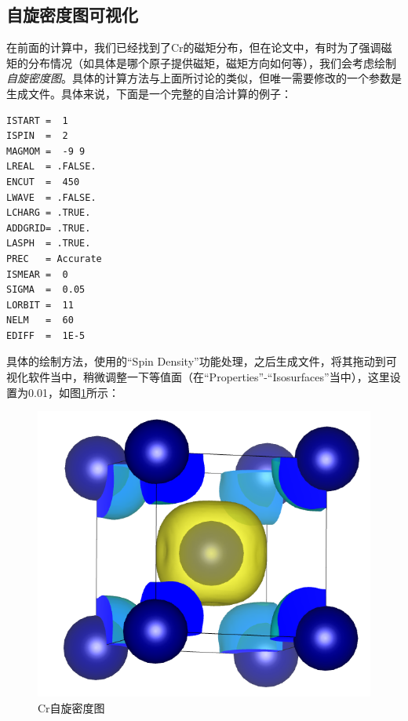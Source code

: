 \subsection{自旋密度图可视化}\label{subsec:磁矩计算-自旋密度图可视化}

在前面的计算中，我们已经找到了Cr的磁矩分布，但在论文中，有时为了强调磁矩的分布情况（如具体是哪个原子提供磁矩，磁矩方向如何等），我们会考虑绘制\emph{自旋密度图}。具体的计算方法与上面所讨论的类似，但唯一需要修改的一个参数是生成文件。具体来说，下面是一个完整的自洽计算的例子：

\begin{lstlisting}[caption=INCAR]
ISTART =  1
ISPIN  =  2
MAGMOM =  -9 9
LREAL  = .FALSE.
ENCUT  =  450
LWAVE  = .FALSE.
LCHARG = .TRUE.
ADDGRID= .TRUE.
LASPH  = .TRUE.
PREC   = Accurate
ISMEAR =  0
SIGMA  =  0.05
LORBIT =  11
NELM   =  60
EDIFF  =  1E-5
\end{lstlisting}

具体的绘制方法，使用的“Spin Density”功能处理，之后生成文件，将其拖动到可视化软件当中，稍微调整一下等值面（在“Properties”-“Isosurfaces”当中），这里设置为0.01，如图\ref{fig:磁矩计算-Cr自旋密度图}所示：

\begin{figure}
    \centering
    \includegraphics[width=1\linewidth]{VASP计算/静态自洽与电荷密度/磁矩计算/fig/Cr自旋密度图.png}
    \caption{Cr自旋密度图}
    \label{fig:磁矩计算-Cr自旋密度图}
\end{figure}

